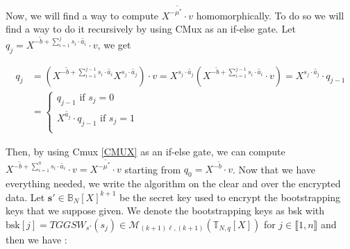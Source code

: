 \documentclass{article}
\newcommand{\T}{\mathbb{T}}
\newcommand{\B}{\mathbb{B}}
\theoremstyle{definition}
\theoremstyle{Theorem}
\begin{document}
Now, we will find a way to compute $X^{-\tilde{\mu^*}} \cdot v$ homomorphically. To do so we will find a way to do it recursively by using CMux as an if-else gate. Let $q_j = X^{-\tilde{b} + \sum_{i=1}^js_i\cdot \tilde{a_i}} \cdot v$, we get 

\begin{equation}
\begin{split}
    q_j &= (X^{-\tilde{b} + \sum_{i=1}^{j-1}s_i\cdot \tilde{a_i}}X^{s_j\cdot \tilde{a_j}})\cdot v = X^{s_j\cdot \tilde{a_j}}(X^{-\tilde{b} + \sum_{i=1}^{j-1}s_i\cdot \tilde{a_i}}\cdot v) = X^{s_j\cdot \tilde{a_j}} \cdot q_{j-1}\\
    &= \begin{cases}
        q_{j-1} \text{ if } s_j = 0\\
        X^{\tilde{a_j}}\cdot q_{j-1} \text{ if } s_j = 1\\
    \end{cases}
\end{split}
\end{equation}

Then, by using Cmux \ref{CMUX} as an if-else gate, we can compute $X^{-\tilde{b} + \sum_{i=1}^ns_i\cdot \tilde{a_i}} \cdot v=X^{-\tilde{\mu^*}} \cdot v$ starting from $q_0 = X^{-\tilde{b}}\cdot v$. Now that we have everything needed, we write the algorithm on the clear and over the encrypted data. Let $\mathbf{s'}\in\B_N[X]^{k+1}$ be the secret key used to encrypt the bootstrapping keys that we suppose given. We denote the bootstrapping keys as bsk with $\text{bsk}[j] = TGGSW_{s'}(s_j) \in \mathcal{M}_{(k+1)\ell,(k+1)}(\T_{N,q}[X])$ for $j \in \llbracket 1,n\rrbracket$ and then we have :\\\\
\end{document}
